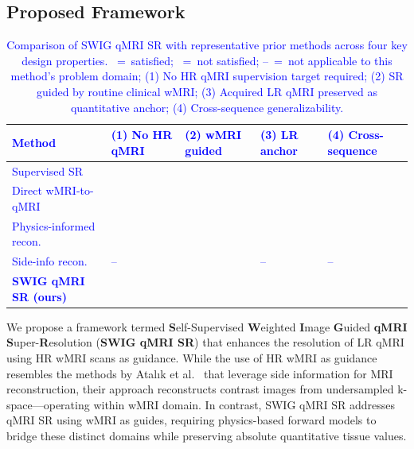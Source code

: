 \documentclass[journal,twoside,web]{ieeecolor}
\newcommand{\added}[1]{\textcolor{blue}{#1}}      %
\begin{document}
\subsection{Proposed Framework}
\begin{table}[!h]
\centering
\renewcommand{\arraystretch}{1.4}
\caption{\added{Comparison of SWIG qMRI SR with representative prior 
methods across four key design properties. \checkmark~=~satisfied; 
\texttimes~=~not satisfied; --~=~not applicable to this method's 
problem domain; (1) No HR qMRI supervision target required; 
(2) SR guided by routine clinical wMRI; (3) Acquired LR qMRI preserved 
as quantitative anchor; (4) Cross-sequence generalizability.}}
\label{tab:method-comparison}
\begin{tabularx}{\textwidth}{>{\hsize}X
                              >{\hsize}Y
                              >{\hsize}Y
                              >{\hsize}Y
                              >{\hsize}Y}
\toprule
\added{\textbf{Method}} & 
\added{\textbf{(1) No HR qMRI}} & 
\added{\textbf{(2) wMRI guided}} & 
\added{\textbf{(3) LR anchor}} & 
\added{\textbf{(4) Cross-sequence}} \\
\midrule
\added{Supervised SR~\cite{b4}}               
  & \added{\texttimes} & \added{\texttimes} & \added{\checkmark} & \added{\checkmark} \\
\added{Direct wMRI-to-qMRI~\cite{b5,b6,b7}}  
  & \added{\checkmark} & \added{\checkmark} & \added{\texttimes}  & \added{\texttimes} \\
\added{Physics-informed recon.~\cite{b3}}     
  & \added{\checkmark} & \added{\texttimes}  & \added{\texttimes} & \added{\texttimes} \\
\added{Side-info recon.~\cite{b8}}            
  & \added{--} & \added{\checkmark} & \added{--}  & \added{--} \\
\added{\textbf{SWIG qMRI SR (ours)}}          
  & \added{\checkmark} & \added{\checkmark} & \added{\checkmark} & \added{\checkmark} \\
\bottomrule
\end{tabularx}
\end{table}
We propose a framework termed \textbf{S}elf-Supervised \textbf{W}eighted \textbf{I}mage \textbf{G}uided \textbf{qMRI} \textbf{S}uper-\textbf{R}esolution (\textbf{SWIG qMRI SR}) that enhances the resolution of LR qMRI using HR wMRI scans as guidance. While the use of HR wMRI as guidance resembles the methods by Atalık et al.~\cite{b8} that leverage side information for MRI reconstruction, their approach reconstructs contrast images from undersampled k-space—operating  within wMRI domain. In contrast, SWIG qMRI SR addresses qMRI SR using wMRI as guides, requiring physics-based forward models to bridge these distinct domains while preserving absolute quantitative tissue values.
\end{document}
